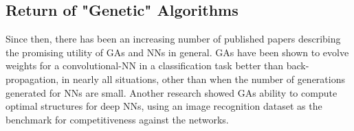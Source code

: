 \documentclass[12pt,a4paper]{article}
\begin{document}
        


    \subsection{Return of "Genetic" Algorithms}

        Since then, there has been an increasing number of published papers describing the promising utility of GAs and NNs in general. GAs have been shown to evolve weights for a convolutional-NN in a classification task better than back-propagation, in nearly all situations, other than when the number of generations generated for NNs are small. \cite{perez_apply_nodate} Another research showed GAs ability to compute optimal structures for deep NNs, using an image recognition dataset as the benchmark for competitiveness against the networks. \cite{xie_genetic_2017}
        
\end{document}
